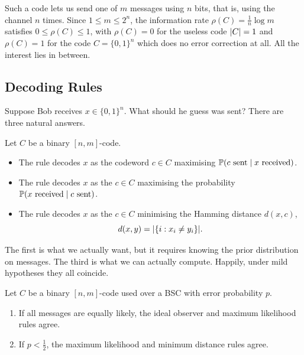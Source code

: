 \documentclass[a4paper]{scrartcl}
\begin{document}
Such a code lets us send one of $m$ messages using $n$ bits, that is, using the channel $n$ times. Since $1 \le m \le 2^n$, the information rate $\rho(C) = \frac1n \log m$ satisfies $0 \le \rho(C) \le 1$, with $\rho(C) = 0$ for the useless code $\lvert C\rvert = 1$ and $\rho(C) = 1$ for the code $C = \{0,1\}^n$ which does no error correction at all. All the interest lies in between.

\subsection{Decoding Rules}

Suppose Bob receives $x \in \{0,1\}^n$. What should he guess was sent? There are three natural answers.

\begin{definition}
	Let $C$ be a binary $[n,m]$-code.
	\begin{itemize}
		\item The  rule decodes $x$ as the codeword $c \in C$ maximising $\mathbb{P}(c \text{ sent} \mid x \text{ received})$.
		\item The  rule decodes $x$ as the $c \in C$ maximising the probability $\mathbb{P}(x \text{ received} \mid c \text{ sent})$.
		\item The  rule decodes $x$ as the $c \in C$ minimising the Hamming distance $d(x,c)$,
		$$d(x,y) = \lvert\{i : x_i \ne y_i\}\rvert.$$
	\end{itemize}
\end{definition}

The first is what we actually want, but it requires knowing the prior distribution on messages. The third is what we can actually compute. Happily, under mild hypotheses they all coincide.

\begin{lemma}\label{lem:decoding}
	Let $C$ be a binary $[n,m]$-code used over a BSC with error probability $p$.
	\begin{enumerate}[label=(\roman*)]
		\item If all messages are equally likely, the ideal observer and maximum likelihood rules agree.
		\item If $p < \tfrac12$, the maximum likelihood and minimum distance rules agree.
	\end{enumerate}
\end{lemma}
\end{document}
